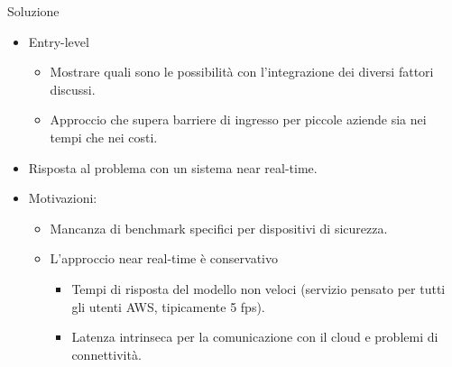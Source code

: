 \documentclass{beamer}
\begin{document}


\begin{frame}{Soluzione}

\begin{itemize}
    \item Entry-level
    \begin{itemize}
        \item Mostrare quali sono le possibilità con l'integrazione dei diversi fattori discussi.
        \item Approccio che supera barriere di ingresso per piccole aziende sia nei tempi che nei costi.
    \end{itemize}
    
    \item Risposta al problema con un sistema near real-time.

    \item Motivazioni:
    \begin{itemize}
        \item Mancanza di benchmark specifici per dispositivi di sicurezza.
        \item L'approccio near real-time è conservativo
        \begin{itemize}
            \item Tempi di risposta del modello non veloci (servizio pensato per tutti gli utenti AWS, tipicamente 5 fps).
            \item Latenza intrinseca per la comunicazione con il cloud e problemi di connettività.
        \end{itemize}
    \end{itemize}
\end{itemize}

\end{frame}
\end{document}
